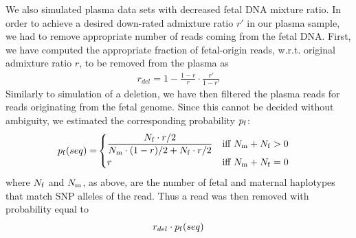 	We also simulated plasma data sets with decreased fetal DNA mixture ratio. In order to achieve a desired down-rated admixture ratio $r'$ in our plasma sample, we had to remove appropriate number of reads coming from the fetal DNA. First, we have computed the appropriate fraction of fetal-origin reads, w.r.t. original admixture ratio $r$, to be removed from the plasma as
\begin{align}
r_{del} = 1 - \frac{1-r}{r} \cdot \frac{r'}{1-r'}
\end{align}
Similarly to simulation of a deletion, we have then filtered the plasma reads for reads originating from the fetal genome. Since this cannot be decided without ambiguity, we estimated the corresponding probability $p_{\mathrm{f}}$:
\begin{align*}
p_\f(seq) =& 
  \begin{cases}
    \mathlarger{\frac{ N_\f \cdot r/2 }{ N_\m \cdot (1-r)/2 + N_\f \cdot r/2}} & \text{iff } N_\m+N_\f>0 \\
    r & \text{iff } N_\m+N_\f=0
  \end{cases}
\end{align*}
where $N_{\mathrm{f}}$ and $N_{\mathrm{m}}$, as above, are the number of fetal and maternal haplotypes that match SNP alleles of the read. Thus a read was then removed with probability equal to
\begin{align}
r_{del} \cdot p_{\mathrm{f}}(seq)
\end{align}
